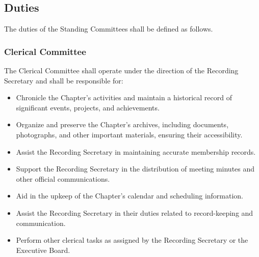 \documentclass[10pt, oneside]{article}
\begin{document}
\subsection{Duties}
The duties of the Standing Committees shall be defined as follows.

\subsubsection{Clerical Committee}
The Clerical Committee shall operate under the direction of the Recording Secretary and shall be responsible for:
\begin{itemize}
    \item Chronicle the Chapter's activities and maintain a historical record of significant events, projects, and achievements.
    \item Organize and preserve the Chapter's archives, including documents, photographs, and other important materials, ensuring their accessibility.
    \item Assist the Recording Secretary in maintaining accurate membership records.
    \item Support the Recording Secretary in the distribution of meeting minutes and other official communications.
    \item Aid in the upkeep of the Chapter's calendar and scheduling information.
    \item Assist the Recording Secretary in their duties related to record-keeping and communication.
    \item Perform other clerical tasks as assigned by the Recording Secretary or the Executive Board.
\end{itemize}
\end{document}
